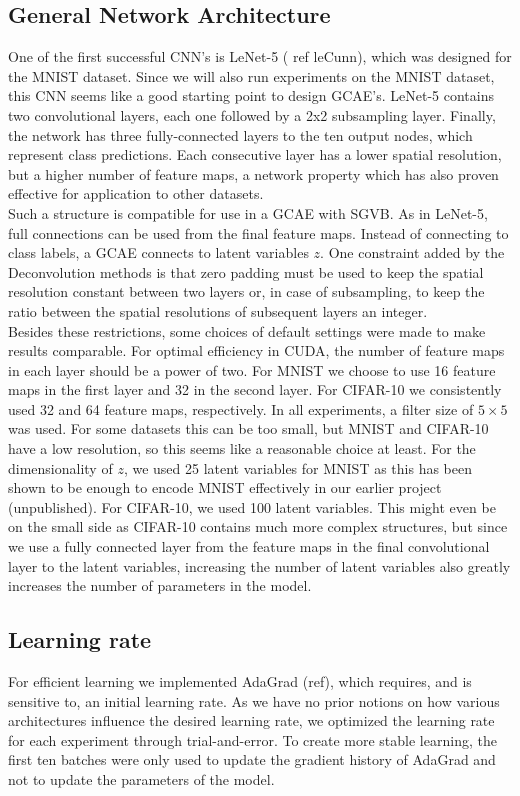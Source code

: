 \subsection{General Network Architecture}
One of the first successful CNN's is LeNet-5 ( ref leCunn), which was designed for the MNIST dataset. Since we will also run experiments on the MNIST dataset, this CNN seems like a good starting point to design GCAE's. LeNet-5 contains two convolutional layers, each one followed by a 2x2 subsampling layer. Finally, the network has three fully-connected layers to the ten output nodes, which represent class predictions. Each consecutive layer has a lower spatial resolution, but a higher number of feature maps, a network property which has also proven effective for application to other datasets.\\
Such a structure is compatible for use in a GCAE with SGVB. As in LeNet-5, full connections can be used from the final feature maps. Instead of connecting to class labels, a GCAE connects to latent variables $z$. One constraint added by the Deconvolution methods is that zero padding must be used to keep the spatial resolution constant between two layers or, in case of subsampling, to keep the ratio between the spatial resolutions of subsequent layers an integer.  \\
Besides these restrictions, some choices of default settings were made to make results comparable. For optimal efficiency in CUDA, the number of feature maps in each layer should be a power of two. For MNIST we choose to use 16 feature maps in the first layer and 32 in the second layer. For CIFAR-10 we consistently used 32 and 64 feature maps, respectively. In all experiments, a filter size of $5 \times 5$ was used. For some datasets this can be too small, but MNIST and CIFAR-10 have a low resolution, so this seems like a reasonable choice at least. For the dimensionality of $z$, we used 25 latent variables for MNIST as this has been shown to be enough to encode MNIST effectively in our earlier project (unpublished). For CIFAR-10, we used 100 latent variables. This might even be on the small side as CIFAR-10 contains much more complex structures, but since we use a fully connected layer from the feature maps in the final convolutional layer to the latent variables, increasing the number of latent variables also greatly increases the number of parameters in the model.

\subsection{Learning rate}

For efficient learning we implemented AdaGrad (ref), which requires, and is sensitive to, an initial learning rate. As we have no prior notions on how various architectures influence the desired learning rate, we optimized the learning rate for each experiment through trial-and-error. To create more stable learning, the first ten batches were only used to update the gradient history of AdaGrad and not to update the parameters of the model.

\newpage